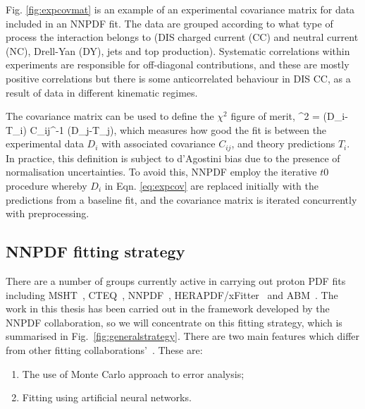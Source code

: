 Fig. \ref{fig:expcovmat} is an example of an experimental covariance matrix for data included in an NNPDF fit. The data are grouped according to what type of process the interaction belongs to (DIS charged current (CC) and neutral current (NC), Drell-Yan (DY), jets and top production). Systematic correlations within experiments are responsible for off-diagonal contributions, and these are mostly positive correlations but there is some anticorrelated behaviour in DIS CC, as a result of data in different kinematic regimes. 

The covariance matrix can be used to define the $\chi^2$ figure of merit, 
\be
\label{eqn:chi2}
\chi^2 =  (D_i-T_i) C_{ij}^{-1} (D_j-T_j),
\ee
which measures how good the fit is between the experimental data $D_i$ with associated covariance $C_{ij}$, and theory predictions $T_i$. In practice, this definition is subject to d'Agostini bias \cite{DAgostini:1993arp} due to the presence of normalisation uncertainties. To avoid this, NNPDF employ the iterative $t0$ procedure \cite{Ball:2009qv} whereby $D_i$ in Eqn. \ref{eq:expcov} are replaced initially with the predictions from a baseline fit, and the covariance matrix is iterated concurrently with preprocessing. 


\subsection{NNPDF fitting strategy}

There are a number of groups currently active in carrying out proton PDF fits including MSHT~\cite{Bailey:2020ooq}, CTEQ~\cite{Hou:2019efy}, NNPDF~\cite{nnpdf}, HERAPDF/xFitter~\cite{CooperSarkar:2011aa} and ABM~\cite{Alekhin:2019ntu}. The work in this thesis has been carried out in the framework developed by the NNPDF collaboration, so we will concentrate on this fitting strategy, which is summarised in Fig.~\ref{fig:generalstrategy}. There are two main features which differ from other fitting collaborations'~\cite{Forte:2002fg}. These are:
\begin{enumerate}
\item  The use of Monte Carlo approach to error analysis;
    \item  Fitting using artificial neural networks.
\end{enumerate}

